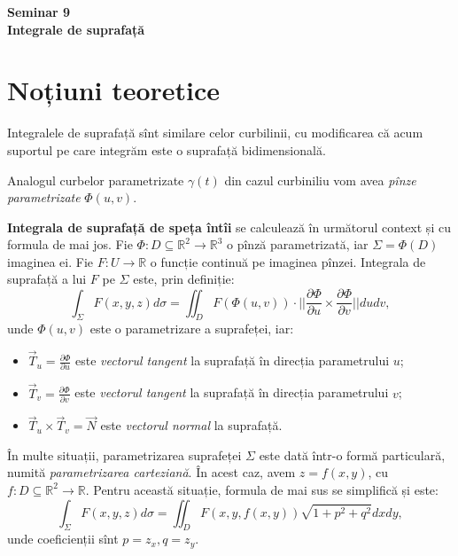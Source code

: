 \documentclass[11pt,a4paper]{article}
\newcommand\seq{\subseteq}
\newcommand\RR{\mathbb{R}}
\theoremstyle{dotless}
\theoremstyle{dotlessdr}
\begin{document}
\begin{center}
  {\large\textbf{Seminar 9 \\
      Integrale de suprafață}}
\end{center}

\vspace{2cm}

\section*{Noțiuni teoretice}

\indent\indent Integralele de suprafață sînt similare celor curbilinii, cu modificarea
că acum suportul pe care integrăm este o suprafață bidimensională.

Analogul curbelor parametrizate $ \gamma(t) $ din cazul curbiniliu vom avea
\emph{pînze parametrizate} $ \Phi(u, v) $.

\textbf{Integrala de suprafață de speța întîi} se calculează în următorul context
și cu formula de mai jos. Fie $ \Phi : D \seq \RR^2 \to \RR^3 $ o pînză parametrizată,
iar $ \Sigma = \Phi(D) $ imaginea ei. Fie $ F : U \to \RR $ o funcție continuă
pe imaginea pînzei. Integrala de suprafață a lui $ F $ pe $ \Sigma $ este, prin definiție:
\[
  \int_\Sigma F(x, y, z) d \sigma = \iint_D F(\Phi(u,v)) \cdot %
  \Big|\Big| \frac{\partial \Phi}{\partial u} \times \frac{\partial \Phi}{\partial v} \Big|\Big| %
  dudv,
\]
unde $ \Phi(u, v) $ este o parametrizare a suprafeței, iar:
\begin{itemize}
\item $ \vec{T}_u = \frac{\partial \Phi}{\partial u} $ este \emph{vectorul tangent} la
  suprafață în direcția parametrului $ u $;
\item $ \vec{T}_v = \frac{\partial \Phi}{\partial v} $ este \emph{vectorul tangent} la
  suprafață în direcția parametrului $ v $;
\item $ \vec{T}_u \times \vec{T}_v = \vec{N} $ este \emph{vectorul normal} la suprafață.
\end{itemize}

În multe situații, parametrizarea suprafeței $ \Sigma $ este dată într-o formă particulară,
numită \emph{parametrizarea carteziană}. În acest caz, avem $ z = f(x, y) $, cu
$ f : D \seq \RR^2 \to \RR $. Pentru această situație, formula de mai sus se simplifică
și este:
\[
  \int_\Sigma F(x, y, z) d\sigma = \iint_D F(x, y, f(x, y)) \sqrt{1 + p^2 + q^2} dxdy,
\]
unde coeficienții sînt $ p = z_x, q = z_y $.

\vspace{1cm}
\end{document}
